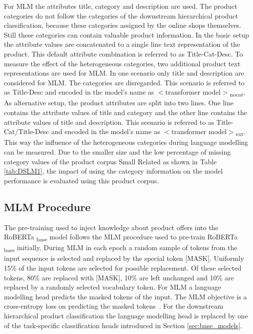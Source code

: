 \documentclass[11pt,dvipdfm]{article}
\begin{document}
For \ac{MLM} the attributes title, category and description are used.
The product categories do not follow the categories of the downstream hierarchical product classification, because these categories assigned by the online shops themselves.
Still these categories can contain valuable product information.
In the basic setup the attribute values are concatenated to a single line text representation of the product.
This default attribute combination is referred to as Title-Cat-Desc.
To measure the effect of the heterogeneous categories, two additional product text representations are used for \ac{MLM}.
In one scenario only title and description are considered for \ac{MLM}.
The categories are disregarded. 
This scenario is referred to as Title-Desc and encoded in the model's name as $<$transformer model$>$\textsubscript{nocat}.
As alternative setup, the product attributes are split into two lines.
One line contains the attribute values of title and category and the other line contains the attribute values of title and description.
This scenario is referred to as Title-Cat/Title-Desc and encoded in the model's name as $<$transformer model$>$\textsubscript{ext}.
This way the influence of the heterogeneous categories during language modelling can be measured.
Due to the smaller size and the low percentage of missing category values of the product corpus Small Related as shown in Table \ref{tab:DSLM1}, the impact of using the category information on the model performance is evaluated using this product corpus.

\subsection{MLM Procedure}

The pre-training used to inject knowledge about product offers into the RoBERTa \textsubscript{base} model follows the \ac{MLM} procedure used to pre-train RoBERTa \textsubscript{base} initially.
During \ac{MLM} in each epoch a random sample of tokens from the input sequence is selected and replaced by the special token [MASK]. 
Uniformly 15\% of the input tokens are selected for possible replacement. 
Of these selected tokens, 80\% are replaced with [MASK], 10\% are left unchanged and 10\% are replaced by a randomly selected vocabulary token.
For \ac{MLM} a language modelling head predicts the masked tokens of the input.
The \ac{MLM} objective is a cross-entropy loss on predicting the masked tokens~\cite{devlin_bert_2019, liu_roberta_2019}.
For the downstream hierarchical product classification the language modelling head is replaced by one of the task-specific classification heads introduced in Section \ref{sec:base_models}.
\end{document}
